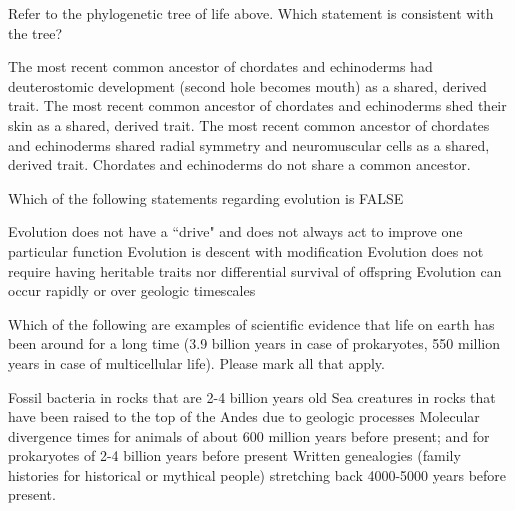\documentclass[exam,addpoints,noanswers]{exam}
\begin{document}
\begin{questions}

\question[1] Refer to the phylogenetic tree of life above. Which statement is consistent with the tree?
 \begin{choices}
\CorrectChoice The most recent common ancestor of chordates and echinoderms had deuterostomic development (second hole becomes mouth) as a shared, derived trait.
\choice The most recent common ancestor of chordates and echinoderms shed their skin as a shared, derived trait.
\choice The most recent common ancestor of chordates and echinoderms shared radial symmetry and neuromuscular cells as a shared, derived trait. 
\choice Chordates and echinoderms do not share a common ancestor. 
\end{choices}


\question[1] Which of the following statements regarding evolution is FALSE
\begin{choices}
\choice Evolution does not have a ``drive" and does not always act to improve one particular function
\choice Evolution is descent with modification
\CorrectChoice Evolution does not require having heritable traits nor differential survival of offspring
\choice Evolution can occur rapidly or over geologic timescales
\end{choices}



\question[1] Which of the following are examples of scientific evidence that life on earth has been around for a long time (3.9 billion years in case of prokaryotes, 550 million years in case of multicellular life). Please mark all that apply. 
\begin{choices}
\CorrectChoice Fossil bacteria in rocks that are 2-4 billion years old
\CorrectChoice Sea creatures in rocks that have been raised to the top of the Andes due to geologic processes
\CorrectChoice Molecular divergence times for animals of about 600 million years before present; and for prokaryotes of 2-4 billion years before present
\choice Written genealogies (family histories for historical or mythical people) stretching back 4000-5000 years before present. 
\end{choices}




\end{questions}
\end{document}
